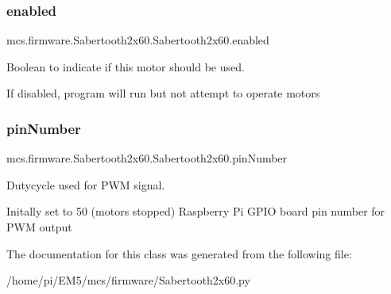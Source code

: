 \subsubsection{\texorpdfstring{enabled}{enabled}}
{\footnotesize\ttfamily mcs.\+firmware.\+Sabertooth2x60.\+Sabertooth2x60.\+enabled}



Boolean to indicate if this motor should be used. 

If disabled, program will run but not attempt to operate motors \mbox{\label{classmcs_1_1firmware_1_1Sabertooth2x60_1_1Sabertooth2x60_a7ecd96fe9fd037dd332643107aa3ea8b}} 
\subsubsection{\texorpdfstring{pin\+Number}{pinNumber}}
{\footnotesize\ttfamily mcs.\+firmware.\+Sabertooth2x60.\+Sabertooth2x60.\+pin\+Number}



Dutycycle used for P\+WM signal. 

Initally set to 50 (motors stopped) Raspberry Pi G\+P\+IO board pin number for P\+WM output 

The documentation for this class was generated from the following file\+:\begin{DoxyCompactItemize}
\item 
/home/pi/\+E\+M5/mcs/firmware/Sabertooth2x60.\+py\end{DoxyCompactItemize}
